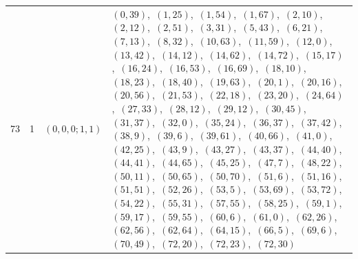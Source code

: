 \documentclass[11pt]{article}
\begin{document}
\begin{longtable}{@{}rrl>{\raggedright\arraybackslash}p{}@{}}
73 & 1 & $(0,0,0;1,1)$ & $(0,39)$,\allowbreak\ $(1,25)$,\allowbreak\ $(1,54)$,\allowbreak\ $(1,67)$,\allowbreak\ $(2,10)$,\allowbreak\ $(2,12)$,\allowbreak\ $(2,51)$,\allowbreak\ $(3,31)$,\allowbreak\ $(5,43)$,\allowbreak\ $(6,21)$,\allowbreak\ $(7,13)$,\allowbreak\ $(8,32)$,\allowbreak\ $(10,63)$,\allowbreak\ $(11,59)$,\allowbreak\ $(12,0)$,\allowbreak\ $(13,42)$,\allowbreak\ $(14,12)$,\allowbreak\ $(14,62)$,\allowbreak\ $(14,72)$,\allowbreak\ $(15,17)$,\allowbreak\ $(16,24)$,\allowbreak\ $(16,53)$,\allowbreak\ $(16,69)$,\allowbreak\ $(18,10)$,\allowbreak\ $(18,23)$,\allowbreak\ $(18,40)$,\allowbreak\ $(19,63)$,\allowbreak\ $(20,1)$,\allowbreak\ $(20,16)$,\allowbreak\ $(20,56)$,\allowbreak\ $(21,53)$,\allowbreak\ $(22,18)$,\allowbreak\ $(23,20)$,\allowbreak\ $(24,64)$,\allowbreak\ $(27,33)$,\allowbreak\ $(28,12)$,\allowbreak\ $(29,12)$,\allowbreak\ $(30,45)$,\allowbreak\ $(31,37)$,\allowbreak\ $(32,0)$,\allowbreak\ $(35,24)$,\allowbreak\ $(36,37)$,\allowbreak\ $(37,42)$,\allowbreak\ $(38,9)$,\allowbreak\ $(39,6)$,\allowbreak\ $(39,61)$,\allowbreak\ $(40,66)$,\allowbreak\ $(41,0)$,\allowbreak\ $(42,25)$,\allowbreak\ $(43,9)$,\allowbreak\ $(43,27)$,\allowbreak\ $(43,37)$,\allowbreak\ $(44,40)$,\allowbreak\ $(44,41)$,\allowbreak\ $(44,65)$,\allowbreak\ $(45,25)$,\allowbreak\ $(47,7)$,\allowbreak\ $(48,22)$,\allowbreak\ $(50,11)$,\allowbreak\ $(50,65)$,\allowbreak\ $(50,70)$,\allowbreak\ $(51,6)$,\allowbreak\ $(51,16)$,\allowbreak\ $(51,51)$,\allowbreak\ $(52,26)$,\allowbreak\ $(53,5)$,\allowbreak\ $(53,69)$,\allowbreak\ $(53,72)$,\allowbreak\ $(54,22)$,\allowbreak\ $(55,31)$,\allowbreak\ $(57,55)$,\allowbreak\ $(58,25)$,\allowbreak\ $(59,1)$,\allowbreak\ $(59,17)$,\allowbreak\ $(59,55)$,\allowbreak\ $(60,6)$,\allowbreak\ $(61,0)$,\allowbreak\ $(62,26)$,\allowbreak\ $(62,56)$,\allowbreak\ $(62,64)$,\allowbreak\ $(64,15)$,\allowbreak\ $(66,5)$,\allowbreak\ $(69,6)$,\allowbreak\ $(70,49)$,\allowbreak\ $(72,20)$,\allowbreak\ $(72,23)$,\allowbreak\ $(72,30)$\\

\end{longtable}
\end{document}
